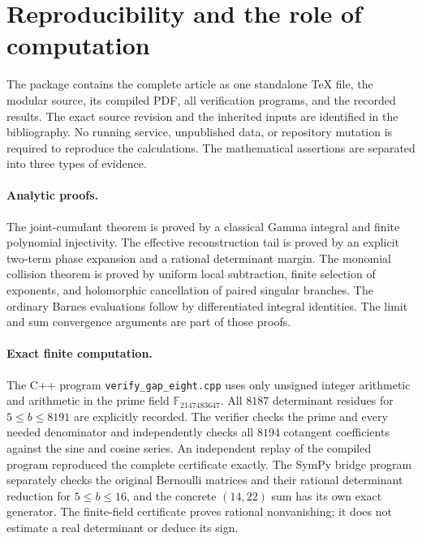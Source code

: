 \section{Reproducibility and the role of computation}
\label{repro:section}

The package contains the complete article as one standalone TeX file,
the modular source, its compiled PDF, all verification programs, and
the recorded results. The exact source revision and the inherited
inputs are identified in the bibliography. No running service,
unpublished data, or repository mutation is required to reproduce the
calculations. The mathematical assertions are separated into three
types of evidence.

\paragraph{Analytic proofs.}
The joint-cumulant theorem is proved by a classical Gamma integral and
finite polynomial injectivity. The effective reconstruction tail is
proved by an explicit two-term phase expansion and a rational
determinant margin. The monomial collision theorem is proved by
uniform local subtraction, finite selection of exponents, and
holomorphic cancellation of paired singular branches. The ordinary
Barnes evaluations follow by differentiated integral identities.
The limit and sum convergence arguments are part of those proofs.

\paragraph{Exact finite computation.}
The C++ program \texttt{verify\_gap\_eight.cpp} uses only unsigned
integer arithmetic and arithmetic in the prime field
$\mathbb F_{2147483647}$. All $8187$ determinant residues for
$5\le b\le8191$ are explicitly recorded. The verifier checks the
prime and every needed denominator and independently checks all
$8194$ cotangent coefficients against the sine and cosine series.
An independent replay of the compiled program reproduced the complete
certificate exactly. The SymPy bridge program separately checks the
original Bernoulli matrices and their rational determinant reduction
for $5\le b\le16$, and the concrete $(14,22)$ sum has its own exact
generator. The finite-field certificate proves rational nonvanishing;
it does not estimate a real determinant or deduce its sign.

